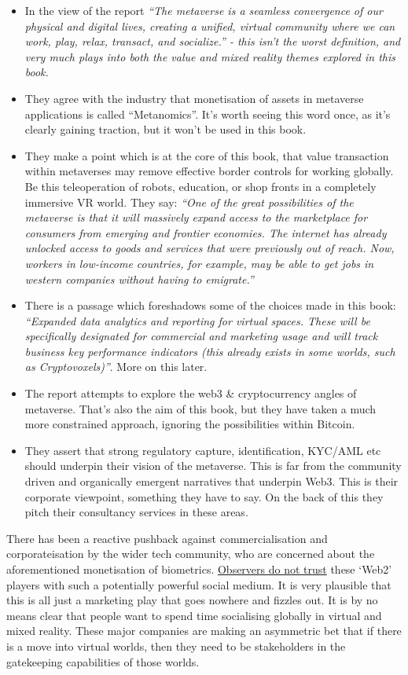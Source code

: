 \begin{itemize}
\item In the view of the report \textit{``The metaverse is a seamless convergence of our physical and digital lives, creating a unified, virtual community where we can work, play, relax, transact, and socialize.'' - this isn't the worst definition, and very much plays into both the value and mixed reality themes explored in this book.}
\item They agree with the industry that monetisation of assets in metaverse applications is called ``Metanomics''. It's worth seeing this word once, as it's clearly gaining traction, but it won't be used in this book.
\item They make a point which is at the core of this book, that value transaction within metaverses may remove effective border controls for working globally. Be this teleoperation of robots, education, or shop fronts in a completely immersive VR world. They say: \textit{``One of the great possibilities of the metaverse is that it will massively expand access to the marketplace for consumers from emerging and frontier economies. The internet has already unlocked access to goods and services that were previously out of reach. Now, workers in low-income countries, for example, may be able to get jobs in western companies without having to emigrate.''}
\item There is a passage which foreshadows some of the choices made in this book: \textit{``Expanded data analytics and reporting for virtual spaces. These will be specifically designated for commercial and marketing usage and will track business key performance indicators (this
already exists in some worlds, such as Cryptovoxels)''}. More on this later.
\item The report attempts to explore the web3 \& cryptocurrency angles of metaverse. That's also the aim of this book, but they have taken a much more constrained approach, ignoring the possibilities within Bitcoin.
\item They assert that strong regulatory capture, identification, KYC/AML etc should underpin their vision of the metaverse. This is far from the community driven and organically emergent narratives that underpin Web3. This is their corporate viewpoint, something they have to say. On the back of this they pitch their consultancy services in these areas.
\end{itemize}
There has been a reactive pushback against commercialisation and corporateisation by the wider tech community, who are concerned about the aforementioned monetisation of biometrics. \href{https://www.coindesk.com/layer2/2022/01/19/meta-leans-in-to-tracking-your-emotions-in-the-metaverse/}{Observers do not trust} these `Web2' players with such a potentially powerful social medium. It is very plausible that this is all just a marketing play that goes nowhere and fizzles out. It is by no means clear that people want to spend time socialising globally in virtual and mixed reality. These major companies are  making an asymmetric bet that if there is a move into virtual worlds, then they need to be stakeholders in the gatekeeping capabilities of those worlds.
